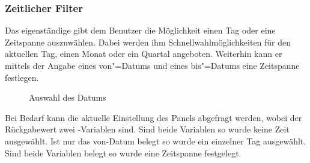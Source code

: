 \subsubsection{Zeitlicher Filter}

Das eigenständige   gibt dem Benutzer die Möglichkeit einen Tag oder eine Zeitspanne auszuwählen.
Dabei werden ihm Schnellwahlmöglichkeiten für den aktuellen Tag, einen Monat oder ein Quartal angeboten.
Weiterhin kann er mittels der Angabe eines von"=Datums und eines bis"=Datums eine Zeitspanne festlegen.

\begin{wrapfigure}{o}{0.4\textwidth}
  \centering
  \caption{Auswahl des Datums} \label{fig:jxdatepicker} 
\end{wrapfigure}

Bei Bedarf kann die aktuelle Einstellung des Panels abgefragt werden, wobei der Rückgabewert zwei -Variablen sind.
Sind beide Variablen  so wurde keine Zeit ausgewählt.
Ist nur das von-Datum belegt so wurde ein einzelner Tag ausgewählt.
Sind beide Variablen belegt so wurde eine Zeitspanne festgelegt.

